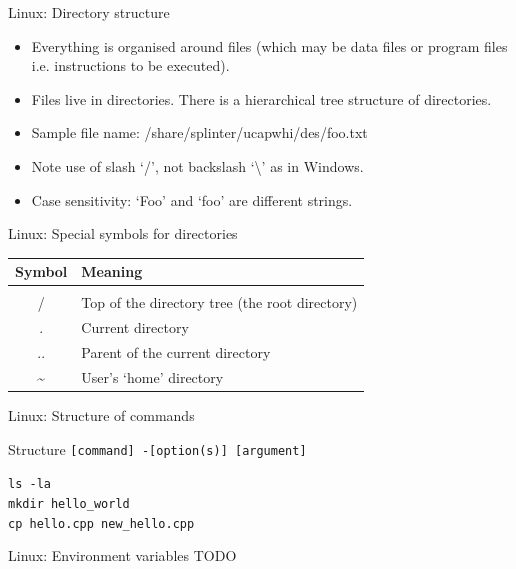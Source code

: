 \documentclass{beamer}
\begin{document}
\begin{frame}{Linux: Directory structure}
  \begin{itemize}
    \item{Everything is organised around files (which may be data files or program files i.e. instructions to be executed).}
    \item{Files live in directories. There is a hierarchical tree structure of directories.}
    \item{Sample file name: /share/splinter/ucapwhi/des/foo.txt}
    \item{Note use of slash `/', not backslash `\textbackslash' as in Windows.}
    \item{Case sensitivity: `Foo' and `foo' are different strings.}
  \end{itemize}
\end{frame}

\begin{frame}{Linux: Special symbols for directories}
  \begin{table}[ht]
    \centering
    \begin{tabular}{c l}
      \\ [-2ex]
      Symbol & Meaning \\ [.5ex]
      \hline \\ [-2ex]
      / & Top of the directory tree (the root directory) \\
      . & Current directory \\
      .. & Parent of the current directory \\
      \textasciitilde & User's `home' directory
    \end{tabular}
  \end{table}
\end{frame}

\begin{frame}{Linux: Structure of commands}
  \begin{block}{Structure}
    \texttt{[command] -[option(s)] [argument]}
  \end{block}
  \begin{Examples}
     \texttt{ls -la \\
     mkdir hello\_world \\
     cp hello.cpp new\_hello.cpp} \\
  \end{Examples}
\end{frame}

\begin{frame}{Linux: Environment variables}
TODO
\end{frame}
\end{document}

